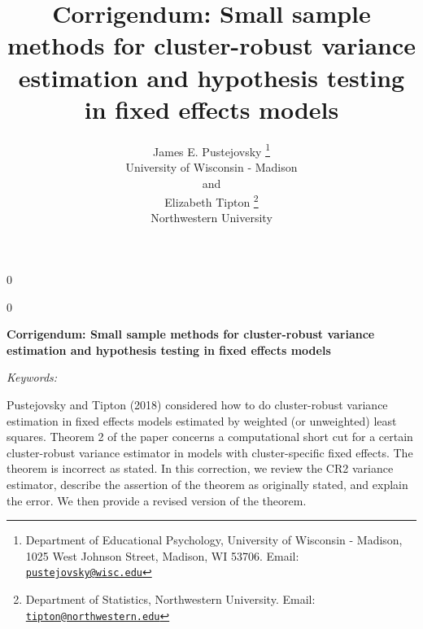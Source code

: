 \documentclass[12pt]{article}
\newcommand{\blind}{0}
\begin{document}
\def\spacingset#1{\renewcommand{\baselinestretch}%
{#1}\small\normalsize} \spacingset{1}



\blind
{
  \title{\bf Corrigendum: Small sample methods for cluster-robust
variance estimation and hypothesis testing in fixed effects models}

  \author{
        James E. Pustejovsky \thanks{Department of Educational
Psychology, University of Wisconsin - Madison, 1025 West Johnson Street,
Madison, WI 53706. Email:
\href{mailto:pustejovsky@wisc.edu}{\nolinkurl{pustejovsky@wisc.edu}}} \\
    University of Wisconsin - Madison\\
     and \\     Elizabeth Tipton \thanks{Department of Statistics,
Northwestern University. Email:
\href{mailto:tipton@northwestern.edu}{\nolinkurl{tipton@northwestern.edu}}} \\
    Northwestern University\\
      }
  \maketitle
} \fi

\blind
{
  \bigskip
  \bigskip
  \bigskip
  \begin{center}
    {\LARGE\bf Corrigendum: Small sample methods for cluster-robust
variance estimation and hypothesis testing in fixed effects models}
  \end{center}
  \medskip
} \fi

\bigskip
\begin{abstract}

\end{abstract}

\noindent%
{\it Keywords:} 
\vfill

\newpage
\spacingset{1.45} %

Pustejovsky and Tipton (2018) considered how to do cluster-robust
variance estimation in fixed effects models estimated by weighted (or
unweighted) least squares. Theorem 2 of the paper concerns a
computational short cut for a certain cluster-robust variance estimator
in models with cluster-specific fixed effects. The theorem is incorrect
as stated. In this correction, we review the CR2 variance estimator,
describe the assertion of the theorem as originally stated, and explain
the error. We then provide a revised version of the theorem.
\end{document}
